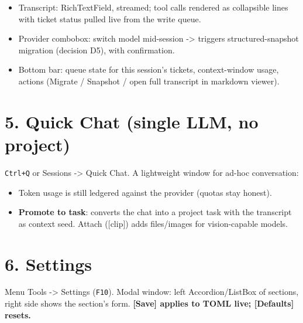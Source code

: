 \documentclass[10pt,a4paper]{article}
\begin{document}
\begin{itemize}
  \item Transcript: RichTextField, streamed; tool calls rendered as collapsible lines with
ticket status pulled live from the write queue.

  \item Provider combobox: switch model mid-session -> triggers structured-snapshot migration
(decision D5), with confirmation.

  \item Bottom bar: queue state for this session's tickets, context-window usage, actions
(Migrate / Snapshot / open full transcript in markdown viewer).

\end{itemize}
\section{5. Quick Chat (single LLM, no project)}
\texttt{Ctrl+Q} or Sessions -> Quick Chat. A lightweight window for ad-hoc conversation:

\begin{center}

\end{center}

\begin{itemize}
  \item Token usage is still ledgered against the provider (quotas stay honest).
  \item \textbf{Promote to task}: converts the chat into a project task with the transcript as
context seed. Attach ([clip]) adds files/images for vision-capable models.

\end{itemize}
\section{6. Settings}
Menu Tools -> Settings (\texttt{F10}). Modal window: left Accordion/ListBox of sections, right side shows the section's form. \textbf{[Save] applies to TOML live; [Defaults] resets.}
\end{document}
